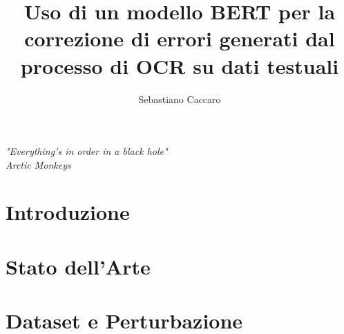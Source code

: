 \documentclass[a4paper,12pt,twoside,openright]{report}
\begin{document}
\renewcommand{\sectionautorefname}{Sezione}
\renewcommand{\subsectionautorefname}{sottosezione}


\newcommand{\E}{È}
\title{Uso di un modello BERT per la correzione di errori generati dal processo di OCR su dati testuali}
\author{Sebastiano Caccaro}
%
% 
%
\beforepreface
\prefacesection{}
\begin{flushright}
\Large {\sl "Everything's in order in a black hole"}\\
\sl \large Arctic Monkeys
\end{flushright}
% 
%

%
%
%

\afterpreface
% 
% 
\chapter*{Introduzione}
\label{sec:intro}


\chapter{Stato dell'Arte}
\label{sec:arte}


\chapter{Dataset e Perturbazione}
\label{sec:dataset}

\end{document}
